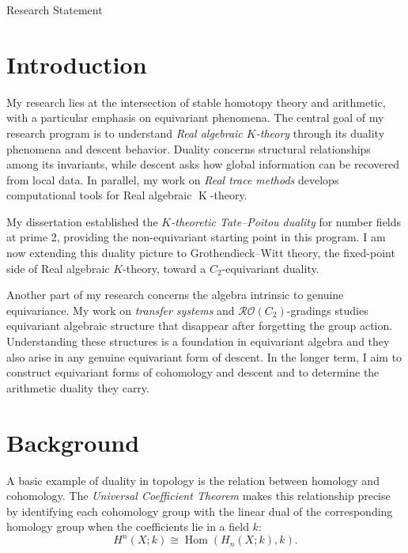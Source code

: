 \documentclass[11pt]{article}
\author{Myungsin Cho}
\date{}
\newcommand{\K}{\operatorname{K}}
\begin{document}
\begin{center}\LARGE{Research Statement}\end{center}\vspace{.5em}
\section*{Introduction}
My research lies at the intersection of stable homotopy theory and arithmetic, with a particular emphasis on equivariant phenomena.
The central goal of my research program is to understand \emph{Real algebraic $K$-theory} through its duality phenomena and descent behavior.
Duality concerns structural relationships among its invariants, while descent asks how global information can be recovered from local data.
In parallel, my work on \emph{Real trace methods} develops computational tools for Real algebraic $\K$-theory.

My dissertation established the \emph{\(K\)-theoretic Tate--Poitou duality} for number fields at prime 2, providing the non-equivariant starting point in this program. 
I am now extending this duality picture to Grothendieck--Witt theory, the fixed-point side of Real algebraic \(K\)-theory, toward a \(C_2\)-equivariant duality. 


Another part of my research concerns the algebra intrinsic to genuine equivariance. 
My work on \emph{transfer systems} and $\mathcal{RO}(C_2)$-gradings studies equivariant algebraic structure that disappear after forgetting the group action. 
Understanding these structures is a foundation in equivariant algebra and they also arise in any genuine equivariant form of descent. 
In the longer term, I aim to construct equivariant forms of cohomology and descent and to determine the arithmetic duality they carry.

\section{Background}
A basic example of duality in topology is the relation between homology and cohomology. 
The \emph{Universal Coefficient Theorem} makes this relationship precise by identifying each cohomology group with the linear dual of the corresponding homology group when the coefficients lie in a field $k$:
\[
H^n(X;k)\cong \operatorname{Hom}(H_n(X;k),k).
\]
\end{document}

